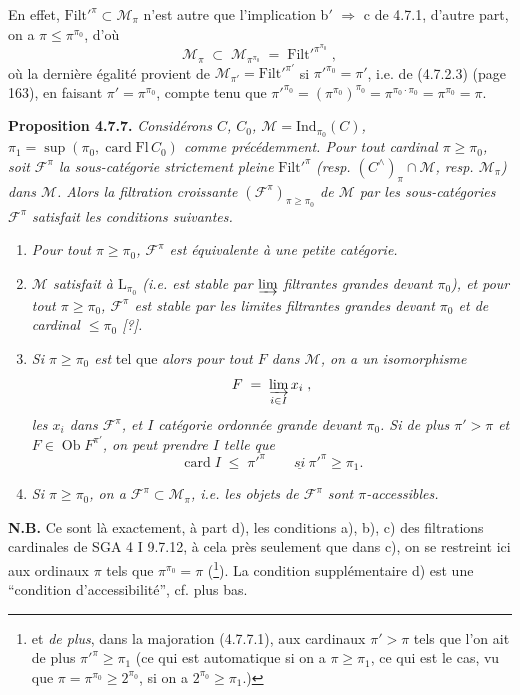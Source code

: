\documentclass[11pt]{article}
\newcommand{\printedpage}[1]{\marginpar{\footnotesize p.~#1}}
\newcommand{\msp}[1]{\marginpar{\footnotesize [#1]}}
\newcommand{\Filt}{\mathrm{Filt}}
\newcommand{\card}{\operatorname{card}}
\newcommand{\Ob}{\operatorname{Ob}}
\newcommand{\Ind}{\mathrm{Ind}}
\begin{document}
En effet, $\Filt'^{\pi} \subset \mathcal{M}_{\pi}$ n’est autre que l’implication b$'$ $\Longrightarrow$ c de 4.7.1, d’autre part, on a $\pi \leqslant \pi^{\pi_0}$, d’où
\[
\mathcal{M}_{\pi} \;\subset\; \mathcal{M}_{\pi^{\pi_0}} \;=\; \Filt'^{\pi^{\pi_0}} \;,
\]
où la dernière égalité provient de $\mathcal{M}_{\pi'} = \Filt'^{\pi'}$ si $\pi'^{\pi_0} = \pi'$, i.e. de (4.7.2.3) (page 163), en faisant $\pi' = \pi^{\pi_0}$, compte tenu que $\pi'^{\pi_0} = (\pi^{\pi_0})^{\pi_0} = \pi^{\pi_0 \cdot \pi_0} = \pi^{\pi_0} = \pi$.

\msp{page 172}
\textbf{Proposition 4.7.7.} \textit{Considérons $C$, $C_0$, $\mathcal{M} = \Ind_{\pi_0}(C)$, $\pi_1 = \sup(\pi_0, \card \mathrm{Fl}\, C_0)$ comme précédemment. Pour tout cardinal $\pi \geqslant \pi_0$, soit $\mathcal{F}^{\pi}$ la sous-catégorie strictement pleine} $\Filt'^{\pi}$ \textit{(resp. $(C^{\wedge})_{\pi} \cap \mathcal{M}$, resp. $\mathcal{M}_{\pi}$) dans $\mathcal{M}$. Alors la filtration croissante $(\mathcal{F}^{\pi})_{\pi \geqslant \pi_0}$ de $\mathcal{M}$ par les sous-catégories $\mathcal{F}^{\pi}$ satisfait les conditions suivantes.}
\begin{enumerate}
\item[\textit{a)}] \textit{Pour tout $\pi \geqslant \pi_0$, $\mathcal{F}^{\pi}$ est équivalente à une petite catégorie.}
\item[\textit{b)}] \textit{$\mathcal{M}$ satisfait à $\mathrm{L}_{\pi_0}$ (i.e. est stable par $\varinjlim$ filtrantes grandes devant $\pi_0$), et pour tout $\pi \geqslant \pi_0$, $\mathcal{F}^{\pi}$ est stable par les limites filtrantes grandes devant $\pi_0$ et de cardinal $\leqslant \pi_0$ [?].}
\printedpage{58}
\item[\textit{c)}] \textit{Si $\pi \geqslant \pi_0$ est} tel que  \textit{alors pour tout $F$ dans $\mathcal{M}$, on a un isomorphisme}
\[
F \;=\; \varinjlim_{i \in I} x_i \;,
\]
\textit{les $x_i$ dans $\mathcal{F}^{\pi}$, et $I$ catégorie ordonnée grande devant $\pi_0$. Si de plus $\pi' > \pi$ et $F \in \Ob F^{\pi'}$, on peut prendre $I$ telle que} %
\[
\card I \;\leqslant\; \pi'^{\pi} \qquad \underline{\textit{si}}\ \pi'^{\pi} \geqslant \pi_1. \tag*{(4.7.7.1)}
\]
\item[\textit{d)}] \textit{Si $\pi \geqslant \pi_0$, on a $\mathcal{F}^{\pi} \subset \mathcal{M}_{\pi}$, i.e. les objets de $\mathcal{F}^{\pi}$ sont $\pi$-accessibles.}
\end{enumerate}
\textbf{N.B.} Ce sont là exactement, à part d), les conditions a), b), c) des filtrations cardinales de SGA 4 I 9.7.12, \msp{page 173} à cela près seulement que dans c), on se restreint ici aux ordinaux $\pi$ tels que $\pi^{\pi_0} = \pi$ (\footnote[72]{et \textit{de plus}, dans la majoration (4.7.7.1), aux cardinaux $\pi' > \pi$ tels que l’on ait de plus $\pi'^{\pi} \geqslant \pi_1$ (ce qui est automatique si on a $\pi \geqslant \pi_1$, ce qui est le cas, vu que $\pi = \pi^{\pi_0} \geqslant 2^{\pi_0}$, si on a $2^{\pi_0} \geqslant \pi_1$.)}). La condition supplémentaire d) est une “condition d’accessibilité”, cf. plus bas.
\end{document}
